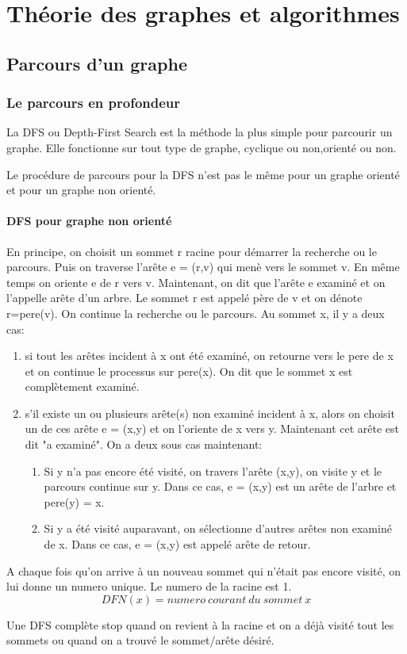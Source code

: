 \chapter{Théorie des graphes et algorithmes}
\section{Parcours d'un graphe}
\subsection{Le parcours en profondeur}
La DFS ou Depth-First Search  est la méthode la plus simple pour parcourir un graphe. Elle fonctionne sur tout type de graphe, cyclique ou non,orienté ou non.

Le procédure de parcours pour la DFS n'est pas le même pour un graphe orienté et pour un graphe non orienté.

\subsubsection{DFS pour graphe non orienté}
En principe, on choisit un sommet r racine pour démarrer la recherche ou le parcours. Puis on traverse l'arête e = (r,v) qui menè vers le sommet v. En même temps on oriente e de r vers v. Maintenant, on dit que l'arête e examiné et on l'appelle arête d'un arbre.
Le sommet r est appelé père de v et on dénote r=pere(v). On continue la recherche ou le parcours.
Au sommet x, il y a deux cas:
\begin{enumerate}
	\item si tout les arêtes incident à x ont été examiné, on retourne vers le pere de x et on continue le processus sur pere(x). On dit que le sommet x est complètement examiné.
	\item s'il existe un ou plusieurs arête(s) non examiné incident à x, alors on choisit un de ces arête e = (x,y) et on l'oriente de x vers y. Maintenant cet arête est dit "a examiné". On a deux sous cas maintenant:
	\begin{enumerate}
		\item Si y n'a pas encore été visité, on travers l'arête (x,y), on visite y et le parcours continue sur y. Dans ce cas, e = (x,y) est un arête de l'arbre et pere(y) = x.
		\item Si y a été visité auparavant, on sélectionne d'autres arêtes non examiné de x. Dans ce cas, e = (x,y) est appelé arête de retour.  
	\end{enumerate} 
\end{enumerate}
A chaque fois qu'on arrive à un nouveau sommet qui n'était pas encore visité, on lui donne un numero unique. Le numero de la racine est 1.
$$DFN(x)=numero\ courant\ du\ sommet\ x$$ 

Une DFS complète stop quand on revient à la racine et on a déjà visité tout les sommets ou quand on a trouvé le sommet/arête désiré. 